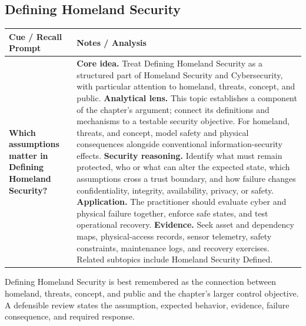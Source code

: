 \documentclass[11pt]{article}
\newcommand{\CornellHeader}{%
\rowcolor{Navy}\color{white}\bfseries Cue / Recall Prompt & \color{white}\bfseries Notes / Analysis\\\hline}
\newcommand{\CornellRow}[2]{%
\cellcolor{CueGray}\RaggedRight\textbf{#1} & \RaggedRight #2\\\hline}
\begin{document}
\subsection*{Defining Homeland Security}
\begin{longtable}{>{\RaggedRight\arraybackslash}p{}|>{\RaggedRight\arraybackslash}p{}}
\CornellHeader
\CornellRow{Which assumptions matter in Defining Homeland Security?}{\textbf{Core idea.} Treat Defining Homeland Security as a structured part of Homeland Security and Cybersecurity, with particular attention to homeland, threats, concept, and public. \textbf{Analytical lens.} This topic establishes a component of the chapter's argument; connect its definitions and mechanisms to a testable security objective. For homeland, threats, and concept, model safety and physical consequences alongside conventional information-security effects. \textbf{Security reasoning.} Identify what must remain protected, who or what can alter the expected state, which assumptions cross a trust boundary, and how failure changes confidentiality, integrity, availability, privacy, or safety. \textbf{Application.} The practitioner should evaluate cyber and physical failure together, enforce safe states, and test operational recovery. \textbf{Evidence.} Seek asset and dependency maps, physical-access records, sensor telemetry, safety constraints, maintenance logs, and recovery exercises. Related subtopics include Homeland Security Defined.}
\end{longtable}
\begin{topicsummary}
Defining Homeland Security is best remembered as the connection between homeland, threats, concept, and public and the chapter's larger control objective. A defensible review states the assumption, expected behavior, evidence, failure consequence, and required response.
\end{topicsummary}
\end{document}
